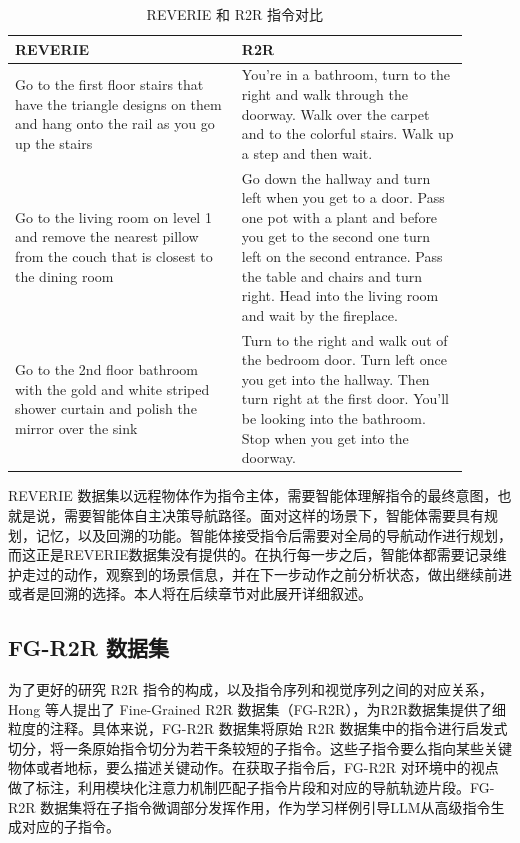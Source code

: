 \documentclass[bachelor]{thesis-uestc}
\begin{document}
\begin{table}[h]
    \centering
    \caption{REVERIE 和 R2R 指令对比}
    \label{rvr2r}
    \begin{tabular}{@{}p{0.45\linewidth}p{0.45\linewidth}@{}}
    \toprule
    \textbf{REVERIE} & \textbf{R2R} \\ \midrule
    Go to the first floor stairs that have the triangle designs on them and hang onto the rail as you go up the stairs & You're in a bathroom, turn to the right and walk through the doorway. Walk over the carpet and to the colorful stairs. Walk up a step and then wait. \\
    Go to the living room on level 1 and remove the nearest pillow from the couch that is closest to the dining room & Go down the hallway and turn left when you get to a door. Pass one pot with a plant and before you get to the second one turn left on the second entrance. Pass the table and chairs and turn right. Head into the living room and wait by the fireplace. \\
    Go to the 2nd floor bathroom with the gold and white striped shower curtain and polish the mirror over the sink & Turn to the right and walk out of the bedroom door. Turn left once you get into the hallway. Then turn right at the first door. You'll be looking into the bathroom. Stop when you get into the doorway. \\
    \bottomrule
    \end{tabular}
    \end{table}

REVERIE 数据集以远程物体作为指令主体，需要智能体理解指令的最终意图，也就是说，需要智能体自主决策导航路径。面对这样的场景下，智能体需要具有规划，记忆，以及回溯的功能。智能体接受指令后需要对全局的导航动作进行规划，而这正是REVERIE数据集没有提供的。在执行每一步之后，智能体都需要记录维护走过的动作，观察到的场景信息，并在下一步动作之前分析状态，做出继续前进或者是回溯的选择。本人将在后续章节对此展开详细叙述。

\subsection{FG-R2R 数据集}
为了更好的研究 R2R 指令的构成，以及指令序列和视觉序列之间的对应关系，Hong 等人\cite{hongSubInstructionAwareVisionandLanguage2020}提出了 Fine-Grained R2R 数据集（FG-R2R），为R2R数据集提供了细粒度的注释。具体来说，FG-R2R 数据集将原始 R2R 数据集中的指令进行启发式切分，将一条原始指令切分为若干条较短的子指令。这些子指令要么指向某些关键物体或者地标，要么描述关键动作。在获取子指令后，FG-R2R 对环境中的视点做了标注，利用模块化注意力机制匹配子指令片段和对应的导航轨迹片段。FG-R2R 数据集将在子指令微调部分发挥作用，作为学习样例引导LLM从高级指令生成对应的子指令。
\end{document}
